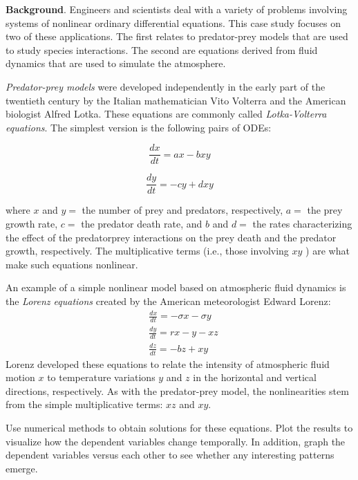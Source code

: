 \noindent\textbf{Background}. Engineers and scientists deal with a variety of problems involving systems of nonlinear ordinary differential equations. This case study focuses on two of these
applications. The first relates to predator-prey models that are used to study species interactions. The second are equations derived from fluid dynamics that are used to simulate the
atmosphere.

\textit{Predator-prey models} were developed independently in the early part of the twentieth
century by the Italian mathematician Vito Volterra and the American biologist Alfred
Lotka. These equations are commonly called \textit{Lotka-Volterra equations}. The simplest version is the following pairs of ODEs:

\begin{equation}
    \tag{22.49}
    \frac{dx}{dt}=ax-bxy
\end{equation}

\begin{equation}
    \tag{22.50}
    \frac{dy}{dt}=-cy+dxy
\end{equation}

\noindent where $x$ and $y=$ the number of prey and predators, respectively, $a=$ the prey growth rate, $c=$ the predator death rate, and $b$ and $d=$ the rates characterizing the effect of the predatorprey interactions on the prey death and the predator growth, respectively. The multiplicative terms (i.e., those involving $x y$ ) are what make such equations nonlinear.

An example of a simple nonlinear model based on atmospheric fluid dynamics is the \textit{Lorenz equations} created by the American meteorologist Edward Lorenz:
$$
\begin{aligned}
&\frac{d x}{d t}=-\sigma x-\sigma y \\
&\frac{d y}{d t}=r x-y-x z \\
&\frac{d z}{d t}=-b z+x y
\end{aligned}
$$
Lorenz developed these equations to relate the intensity of atmospheric fluid motion $x$ to temperature variations $y$ and $z$ in the horizontal and vertical directions, respectively. As with the predator-prey model, the nonlinearities stem from the simple multiplicative terms: $xz$ and $xy$.

Use numerical methods to obtain solutions for these equations. Plot the results to visualize how the dependent variables change temporally. In addition, graph the dependent variables versus each other to see whether any interesting patterns emerge.

